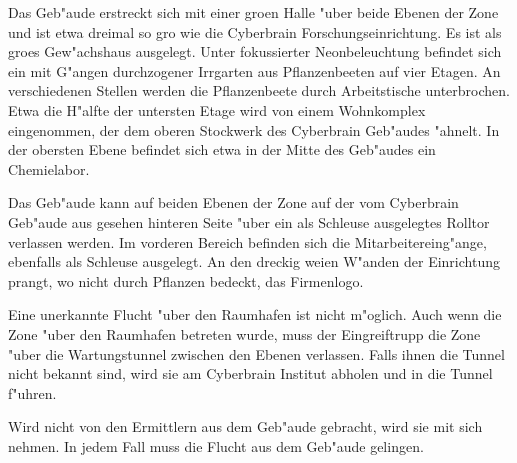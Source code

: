 Das Geb"aude erstreckt sich mit einer gro\3en Halle "uber beide Ebenen der Zone und ist etwa dreimal so gro\3 wie die Cyberbrain Forschungseinrichtung. Es ist als gro\3es Gew"achshaus ausgelegt. Unter fokussierter Neonbeleuchtung befindet sich ein mit G"angen durchzogener Irrgarten aus Pflanzenbeeten auf vier Etagen. An verschiedenen Stellen werden die Pflanzenbeete durch Arbeitstische unterbrochen. Etwa die H"alfte der untersten Etage wird von einem Wohnkomplex eingenommen, der dem oberen Stockwerk des Cyberbrain Geb"audes "ahnelt. In der obersten Ebene befindet sich etwa in der Mitte des Geb"audes ein Chemielabor.

Das Geb"aude kann auf beiden Ebenen der Zone auf der vom Cyberbrain Geb"aude aus gesehen hinteren Seite "uber ein als Schleuse ausgelegtes Rolltor verlassen werden. Im vorderen Bereich befinden sich die Mitarbeitereing"ange, ebenfalls als Schleuse ausgelegt. An den dreckig wei\3en W"anden der Einrichtung prangt, wo nicht durch Pflanzen bedeckt, das Firmenlogo.

Eine unerkannte Flucht "uber den Raumhafen ist nicht m"oglich. Auch wenn die Zone "uber den Raumhafen betreten wurde, muss der Eingreiftrupp die Zone "uber die Wartungstunnel zwischen den Ebenen verlassen. Falls ihnen die Tunnel nicht bekannt sind, wird \xl{} sie am Cyberbrain Institut abholen und in die Tunnel f"uhren.

Wird \ml{} nicht von den Ermittlern aus dem Geb"aude gebracht, wird \xl{} sie mit sich nehmen. In jedem Fall muss \ml{} die Flucht aus dem Geb"aude gelingen.
\vfill

